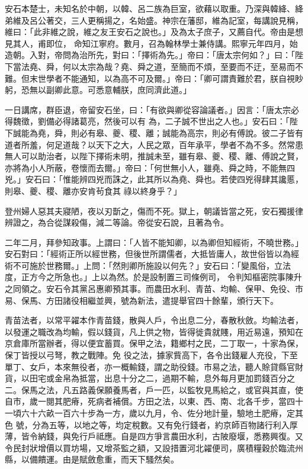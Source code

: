 \begin{pinyinscope}
 安石本楚士，未知名於中朝，以韓、呂二族為巨室，欲藉以取重。乃深與韓絳、絳弟維及呂公著交，三人更稱揚之，名始盛。神宗在藩邸，維為記室，每講說見稱，維曰：「此非維之說，維之友王安石之說也。」及為太子庶子，又薦自代。帝由是想見其人，甫即位，
 命知江寧府。數月，召為翰林學士兼侍講。熙寧元年四月，始造朝。入對，帝問為治所先，對曰：「擇術為先。」帝曰：「唐太宗何如？」曰：「陛下當法堯、舜，何以太宗為哉？堯、舜之道，至簡而不煩，至要而不迂，至易而不難。但末世學者不能通知，以為高不可及爾。」帝曰：「卿可謂責難於君，朕自視眇躬，恐無以副卿此意。可悉意輔朕，庶同濟此道。」



 一日講席，群臣退，帝留安石坐，曰：「有欲與卿從容論議者。」因言：「唐太宗必得魏徵，劉備必得諸葛亮，然後可以有
 為，二子誠不世出之人也。」安石曰：「陛下誠能為堯，舜，則必有皋、夔、稷、離；誠能為高宗，則必有傅說。彼二子皆有道者所羞，何足道哉？以天下之大，人民之眾，百年承平，學者不為不多。然常患無人可以助治者，以陛下擇術未明，推誠未至，雖有皋、夔、稷、離、傅說之賢，亦將為小人所蔽，卷懷而去爾。」帝曰：「何世無小人，雖堯、舜之時，不能無四兇。」安石曰：「惟能辨四兇而誅之，此其所以為堯、舜也。若使四兇得肆其讒慝，則皋、夔、稷、離亦安肯茍食其
 祿以終身乎？」



 登州婦人惡其夫寢陋，夜以刃斮之，傷而不死。獄上，朝議皆當之死，安石獨援律辨證之，為合從謀殺傷，減二等論。帝從安石說，且著為令。



 二年二月，拜參知政事。上謂曰：「人皆不能知卿，以為卿但知經術，不曉世務。」安石對曰：「經術正所以經世務，但後世所謂儒者，大抵皆庸人，故世俗皆以為經術不可施於世務爾。」上問：「然則卿所施設以何先？」安石曰：「變風俗，立法度，正方今之所急也。」上以為然。於是設制置三司條例司，
 令判知樞密院事陳升之同領之。安石令其黨呂惠卿預其事。而農田水利、青苗、均輸、保甲、免役、市易、保馬、方田諸役相繼並興，號為新法，遣提舉官四十餘輩，頒行天下。



 青苗法者，以常平糴本作青苗錢，散與人戶，令出息二分，春散秋斂。均輸法者，以發運之職改為均輸，假以錢貨，凡上供之物，皆得徙貴就賤，用近易遠，預知在京倉庫所當辦者，得以便宜蓄買。保甲之法，籍鄉村之民，二丁取一，十家為保，保丁皆授以弓弩，教之戰陣。免
 役之法，據家貲高下，各令出錢雇人充役，下至單丁、女戶，本來無役者，亦一概輸錢，謂之助役錢。市易之法，聽人賒貸縣官財貨，以田宅或金帛為抵當，出息十分之二，過期不輸，息外每月更加罰錢百分之二。保馬之法，凡五路義保願養馬者，戶一匹，以監牧見馬給之，或官與其直，使自市，歲一閱其肥瘠，死病者補償。方田之法，以東、西、南、北各千步，當四十一頃六十六畝一百六十步為一方，歲以九月，令、佐分地計量，驗地土肥瘠，定其色
 號，分為五等，以地之等，均定稅數。又有免行錢者，約京師百物諸行利入厚薄，皆令納錢，與免行戶祗應。自是四方爭言農田水利，古陂廢堰，悉務興復。又令民封狀增價以買坊場，又增茶監之額，又設措置河北糴便司，廣積糧穀於臨流州縣，以備饋運。由是賦斂愈重，而天下騷然矣。




\end{pinyinscope}
